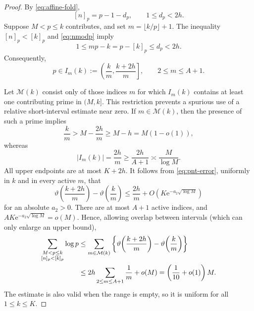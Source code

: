 \documentclass[11pt]{article}
\theoremstyle{remark}
\newcommand{\e}{\mathrm e}
\begin{document}
\begin{proof}
By \eqref{eq:affine-fold},
\begin{equation}\label{eq:nmodp}
 [n]_p=p-1-d_p,
 \qquad 1\leq d_p<2h.
\end{equation}
Suppose \(M<p\leq k\) contributes, and set
\(m=\lfloor k/p\rfloor+1\).  The inequality
\([n]_p<[k]_p\) and \eqref{eq:nmodp} imply
\[
 1\leq mp-k=p-[k]_p\leq d_p<2h.
\]
Consequently,
\begin{equation}\label{eq:active-interval}
 p\in I_m(k):=
 \left(\frac{k}{m},\frac{k+2h}{m}\right],
 \qquad 2\leq m\leq A+1.
\end{equation}

Let \(\mathcal M(k)\) consist only of those indices \(m\) for which
\(I_m(k)\) contains at least one contributing prime in \((M,k]\).
This restriction prevents a spurious use of a relative short-interval
estimate near zero.  If \(m\in\mathcal M(k)\), then the presence of such a
prime implies
\begin{equation}\label{eq:active-scale}
 \frac{k}{m}>M-\frac{2h}{m}\geq M-h=M(1-o(1)),
\end{equation}
whereas
\begin{equation}\label{eq:min-interval-length}
 |I_m(k)|=\frac{2h}{m}\geq\frac{2h}{A+1}
 \asymp\frac{M}{\log M}.
\end{equation}
All upper endpoints are at most \(K+2h\).  It follows from
\eqref{eq:pnt-error}, uniformly in \(k\) and in every active \(m\), that
\begin{equation}\label{eq:interval-pnt}
 \vartheta\!\left(\frac{k+2h}{m}\right)
 -\vartheta\!\left(\frac{k}{m}\right)
 \leq\frac{2h}{m}
 +O\!\left(K\e^{-a_2\sqrt{\log M}}\right)
\end{equation}
for an absolute \(a_2>0\).  There are at most \(A+1\) active indices, and
\(AK\e^{-a_2\sqrt{\log M}}=o(M)\).  Hence, allowing overlap between
intervals (which can only enlarge an upper bound),
\begin{align}
 \sum_{\substack{M<p\leq k\\ {}[n]_p<[k]_p}}\log p
 &\leq
 \sum_{m\in\mathcal M(k)}
 \left\{\vartheta\!\left(\frac{k+2h}{m}\right)
       -\vartheta\!\left(\frac{k}{m}\right)\right\}\notag\\
 &\leq2h\sum_{2\leq m\leq A+1}\frac1m+o(M)
 =\left(\frac1{10}+o(1)\right)M.
 \label{eq:first-level-sum}
\end{align}
The estimate is also valid when the range is empty, so it is uniform for all
\(1\leq k\leq K\).
\end{proof}
\end{document}
